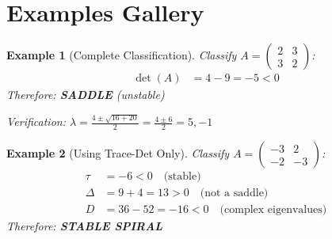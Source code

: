 \documentclass[12pt]{article}
\newtheorem{example}{Example}
\begin{document}
\section{Examples Gallery}

\begin{example}[Complete Classification]
Classify $A = \begin{pmatrix} 2 & 3 \\ 3 & 2 \end{pmatrix}$:
\begin{align}
\det(A) &= 4 - 9 = -5 < 0
\end{align}
Therefore: \textbf{SADDLE} (unstable)

Verification: $\lambda = \frac{4 \pm \sqrt{16 + 20}}{2} = \frac{4 \pm 6}{2} = 5, -1$ \checkmark
\end{example}

\begin{example}[Using Trace-Det Only]
Classify $A = \begin{pmatrix} -3 & 2 \\ -2 & -3 \end{pmatrix}$:
\begin{align}
\tau &= -6 < 0 \quad \text{(stable)} \\
\Delta &= 9 + 4 = 13 > 0 \quad \text{(not a saddle)} \\
D &= 36 - 52 = -16 < 0 \quad \text{(complex eigenvalues)}
\end{align}
Therefore: \textbf{STABLE SPIRAL}
\end{example}
\end{document}
